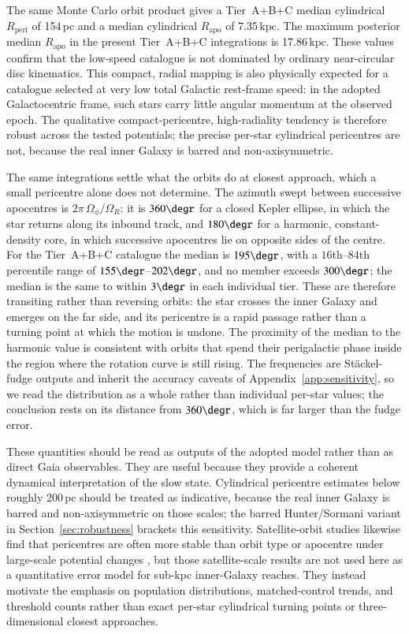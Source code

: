 \documentclass{aa}  %
\newcommand{\kpc}{\ensuremath{\,\mathrm{kpc}}\xspace}
\newcommand{\pc}{\ensuremath{\,\mathrm{pc}}\xspace}
\newcommand{\Rperi}{R_{\mathrm{peri}}}
\newcommand{\Rapo}{R_{\mathrm{apo}}}
\begin{document}
 The same Monte Carlo orbit product gives a Tier~A+B+C median cylindrical
 $\Rperi$ of 154\,pc and a median cylindrical $\Rapo$ of 7.35\kpc.  The maximum posterior
median $\Rapo$ in the present Tier~A+B+C integrations is 17.86\kpc.
These values confirm that the low-speed catalogue is not
dominated by ordinary near-circular disc kinematics.  This compact,
radial mapping is also physically expected for a catalogue selected at
very low total Galactic rest-frame speed: in the adopted Galactocentric
frame, such stars carry little angular momentum at the observed epoch.
The qualitative compact-pericentre, high-radiality tendency is therefore
 robust across the tested potentials; the precise per-star cylindrical pericentres are
not, because the real inner Galaxy is barred and non-axisymmetric.

The same integrations settle what the orbits do at closest approach, which
a small pericentre alone does not determine.  The azimuth swept between
successive apocentres is $2\pi\,\Omega_\phi/\Omega_R$: it is $360\degr$
for a closed Kepler ellipse, in which the star returns along its inbound
track, and $180\degr$ for a harmonic, constant-density core, in which
successive apocentres lie on opposite sides of the centre.  For the
Tier~A+B+C catalogue the median is $195\degr$, with a $16$th--$84$th
percentile range of $155\degr$--$202\degr$, and no member exceeds
$300\degr$; the median is the same to within $3\degr$ in each individual
tier.  These are therefore transiting rather than reversing orbits: the
star crosses the inner Galaxy and emerges on the far side, and its
pericentre is a rapid passage rather than a turning point at which the
motion is undone.  The proximity of the median to the harmonic value is
consistent with orbits that spend their perigalactic phase inside the
region where the rotation curve is still rising.  The frequencies are
St\"ackel-fudge outputs and inherit the accuracy caveats of
Appendix~\ref{app:sensitivity}, so we read the distribution as a whole
rather than individual per-star values; the conclusion rests on its
distance from $360\degr$, which is far larger than the fudge error.

These quantities should be read as outputs of the adopted model rather
than as direct Gaia observables.  They are useful because they provide a
 coherent dynamical interpretation of the slow state.  Cylindrical pericentre
estimates below roughly 200\pc should be treated as indicative, because
the real inner Galaxy is barred and non-axisymmetric on those scales; the
barred Hunter/Sormani variant in Section~\ref{sec:robustness} brackets
this sensitivity.  Satellite-orbit studies likewise find that
pericentres are often more stable than orbit type or apocentre under
large-scale potential changes \citep{Li2021,Pace2022}, but those
satellite-scale results are not used here as a quantitative error model
for sub-kpc inner-Galaxy reaches.  They instead motivate the emphasis on
 population distributions, matched-control trends, and threshold counts
 rather than exact per-star cylindrical turning points or three-dimensional
 closest approaches.
\end{document}
